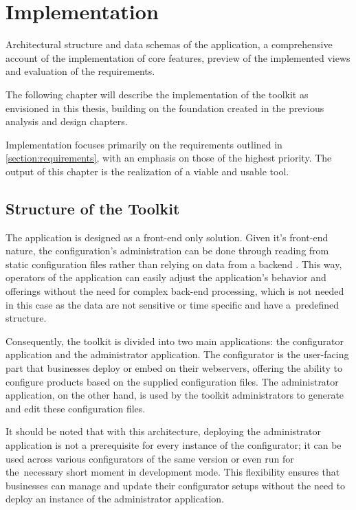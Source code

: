 \chapter{Implementation}

\begin{chapterabstract}
    Architectural structure and data schemas of the application, a comprehensive account of the implementation of core features, preview of the implemented views and evaluation of the requirements.
\end{chapterabstract}

The following chapter will describe the implementation of the toolkit as envisioned in this thesis, building on the foundation created in the previous analysis and design chapters. 

Implementation focuses primarily on the requirements outlined in \autoref{section:requirements}, with an emphasis on those of the highest priority. The output of this chapter is the realization of a viable and usable tool.

\section{Structure of the Toolkit}

The application is designed as a front-end only solution. Given it's front-end nature, the configuration's administration can be done through reading from static configuration files rather than relying on data from a backend . This way, operators of the application can easily adjust the application's behavior and offerings without the need for complex back-end processing, which is not needed in this case as the data are not sensitive or time specific and have a~predefined structure. 

Consequently, the toolkit is divided into two main applications: the configurator application and the administrator application. The configurator is the user-facing part that businesses deploy or embed on their webservers, offering the ability to configure products based on the supplied configuration files. The administrator application, on the other hand, is used by the toolkit administrators to generate and edit these configuration files.

It should be noted that with this architecture, deploying the administrator application is not a prerequisite for every instance of the configurator; it can be used across various configurators of the same version or even run for the~necessary short moment in development mode. This flexibility ensures that businesses can manage and update their configurator setups without the need to deploy an instance of the administrator application.

